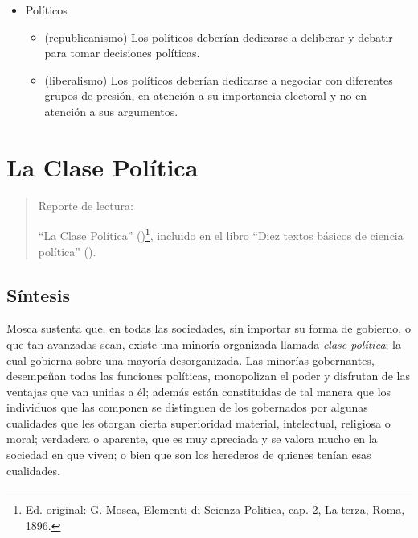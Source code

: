 \documentclass[
  letterpaper,
  DIV=11,
  numbers=noendperiod]{scrreprt}
\providecommand{\tightlist}{%
  \setlength{\itemsep}{0pt}\setlength{\parskip}{0pt}}\usepackage{longtable,booktabs,array}
\begin{document}
\begin{itemize}
\begin{itemize}
    \begin{itemize}
    \tightlist
    \item
      Cada partido/político ofrece un conjunto de políticas públicas y
      lo que hace cada votante es seleccionar que paquete es el que
      efectivamente quiere.
    \end{itemize}
  \end{itemize}
\item
  Políticos

  \begin{itemize}
  \item
    (republicanismo) Los políticos deberían dedicarse a deliberar y
    debatir para tomar decisiones políticas.
  \item
    (liberalismo) Los políticos deberían dedicarse a negociar con
    diferentes grupos de presión, en atención a su importancia electoral
    y no en atención a sus argumentos.
  \end{itemize}
\end{itemize}

\chapter{La Clase Política}\label{clase_pol}

\begin{quote}
Reporte de lectura:

``La Clase Política'' ()\footnote{Ed.
  original: G. Mosca, Elementi di Scienza Politica, cap. 2, La terza,
  Roma, 1896.}, incluido en el libro ``Diez textos básicos de ciencia
política'' ().
\end{quote}

\section{Síntesis}\label{suxedntesis}

Mosca sustenta que, en todas las sociedades, sin importar su forma de
gobierno, o que tan avanzadas sean, existe una minoría organizada
llamada \emph{clase política}; la cual gobierna sobre una mayoría
desorganizada. Las minorías gobernantes, desempeñan todas las funciones
políticas, monopolizan el poder y disfrutan de las ventajas que van
unidas a él; además están constituidas de tal manera que los individuos
que las componen se distinguen de los gobernados por algunas cualidades
que les otorgan cierta superioridad material, intelectual, religiosa o
moral; verdadera o aparente, que es muy apreciada y se valora mucho en
la sociedad en que viven; o bien que son los herederos de quienes tenían
esas cualidades.
\end{document}
